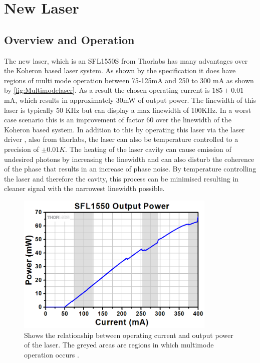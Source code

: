\documentclass[12pt,a4paper,oneside]{report}
\begin{document}
\chapter{New Laser}

\section{Overview and Operation}
The new laser, which is an SFL1550S from Thorlabs \cite{ThorlabsFC/APC} has many advantages over the Koheron based laser system. As shown by the specification it does have regions of multi mode operation between 75-125mA and 250 to 300 mA as shown by \autoref{fig:Multimodelaser}. As a result the chosen operating current is $185 \pm 0.01$ mA, which results in approximately 30mW of output power. The linewidth of this laser is typically 50 KHz but can display a max linewidth of 100KHz. In a worst case scenario this is an improvement of factor 60 over the linewidth of the Koheron based system. In addition to this by operating this laser via the laser driver \cite{CompactPackages}, also from thorlabs, the laser can also be temperature controlled to a precision of $\pm 0.01K$. The heating of the laser cavity can cause emission of undesired photons by increasing the linewidth and can also disturb the coherence of the phase that results in an increase of phase noise. By temperature controlling the laser and therefore the cavity, this process can be minimised resulting in cleaner signal with the narrowest linewidth possible.

\begin{figure}[H] 
\includegraphics[width=0.85\textwidth, center,angle=0]{DImages/Multimodelaser.PNG}
\caption{Shows the relationship between operating current and output power of the laser. The greyed areas are regions in which multimode operation occurs \cite{ThorlabsFC/APC}.}
\label{fig:Multimodelaser}
\end{figure}
\end{document}
